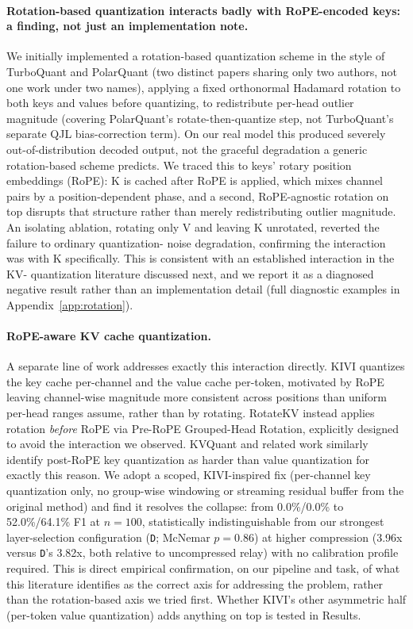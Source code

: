\documentclass[11pt]{article}
\begin{document}
\paragraph{Rotation-based quantization interacts badly with RoPE-encoded
keys: a finding, not just an implementation note.} We initially
implemented a rotation-based quantization scheme in the style of
TurboQuant \citep{turboquant2026} and PolarQuant \citep{polarquant2026}
(two distinct papers sharing only two authors, not one work under two
names), applying a fixed orthonormal Hadamard rotation to both keys and
values before quantizing, to redistribute per-head outlier magnitude
(covering PolarQuant's rotate-then-quantize step, not TurboQuant's
separate QJL bias-correction term). On our real model this produced
severely out-of-distribution decoded output, not the graceful degradation
a generic rotation-based scheme predicts. We traced this to keys' rotary
position embeddings (RoPE): K is cached after RoPE is applied, which
mixes channel pairs by a position-dependent phase, and a second,
RoPE-agnostic rotation on top disrupts that structure rather than merely
redistributing outlier magnitude. An isolating ablation, rotating only V
and leaving K unrotated, reverted the failure to ordinary quantization-
noise degradation, confirming the interaction was with K specifically.
This is consistent with an established interaction in the KV-
quantization literature discussed next, and we report it as a diagnosed
negative result rather than an implementation detail (full diagnostic
examples in Appendix~\ref{app:rotation}).

\paragraph{RoPE-aware KV cache quantization.} A separate line of work
addresses exactly this interaction directly. KIVI \citep{kivi2024}
quantizes the key cache per-channel and the value cache per-token,
motivated by RoPE leaving channel-wise magnitude more consistent across
positions than uniform per-head ranges assume, rather than by rotating.
RotateKV \citep{rotatekv2025} instead applies rotation \emph{before} RoPE
via Pre-RoPE Grouped-Head Rotation, explicitly designed to avoid the
interaction we observed. KVQuant \citep{kvquant2024} and related work
similarly identify post-RoPE key quantization as harder than value
quantization for exactly this reason. We adopt a scoped, KIVI-inspired
fix (per-channel key quantization only, no group-wise windowing or
streaming residual buffer from the original method) and find it resolves
the collapse: from 0.0\%/0.0\% to 52.0\%/64.1\% F1 at $n=100$,
statistically indistinguishable from our strongest layer-selection
configuration (\texttt{D}; McNemar $p=0.86$) at higher compression (3.96x
versus \texttt{D}'s 3.82x, both relative to uncompressed relay) with no
calibration profile required. This is direct empirical confirmation, on
our pipeline and task, of what this literature identifies as the correct
axis for addressing the problem, rather than the rotation-based axis we
tried first. Whether KIVI's other asymmetric half (per-token value
quantization) adds anything on top is tested in Results.
\end{document}

